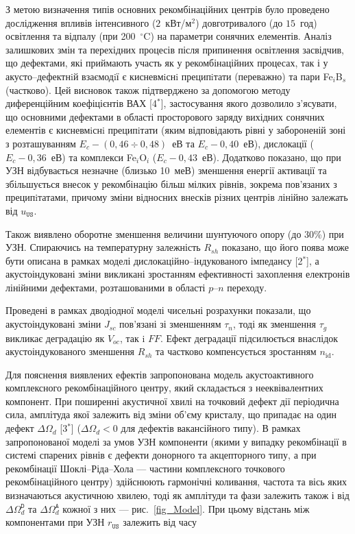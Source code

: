 З метою визначення типів основних рекомбінаційних центрів
було проведено дослідження впливів інтенсивного ($2$~кВт/м$^2$) довготривалого (до  $15$~год) освітлення
та відпалу (при 200~$^\circ$C) на параметри сонячних елементів.
Аналіз залишкових змін та перехідних процесів після припинення освітлення засвідчив, що дефектами, які приймають участь як у рекомбінаційних процесах, так і у акусто--дефектнiй взаємодiї є кисневмiснi преципiтати (переважно) та
пари Fe$_i$B$_s$ (частково).
Цей висновок також підтверджено за допомогою методу диференційним коефіцієнтів ВАХ
[4$^*$],
застосування якого дозволило з'ясувати, що основними дефектами в області просторового заряду вихідних сонячних елементів є кисневмiснi преципiтати  (яким відповідають рівні у забороненій зоні з розташуванням  $E_c-(0,46\div0,48)$~еВ та $E_c-0,40$~еВ), дислокації ($E_c-0,36$~еВ) та комплекси Fe$_i$O$_i$ ($E_c-0,43$~еВ).
Додатково показано, що
при УЗН відбувається незначне (близько 10~меВ) зменшення енергії активації та збільшується внесок
у рекомбінацію більш мілких рівнів, зокрема пов'язаних з преципiтатами, причому зміни відносних внесків різних центрів лінійно залежать від $u_\mathtt{US}$.

Також виявлено оборотне зменшення величини шунтуючого опору (до 30\%) при УЗН.
Спираючись на температурну залежність $R_{sh}$ показано, що його поява може бути описана в рамках моделі дислокаційно--індукованого імпедансу
[2$^*$], а акустоіндуковані зміни викликані зростанням ефективності захоплення електронів лінійними дефектами, розташованими в області $p$--$n$ переходу.

Проведені в рамках дводіодної моделі чисельні розрахунки показали, що акустоіндуковані зміни $J_{sc}$ пов'язані зі зменшенням $\tau_{n}$,
тоді як зменшення $\tau_{g}$ викликає деградацію як $V_{oc}$, так i $F\!F$.
Ефект деградації підсилюється внаслідок акустоіндукованого зменшення $R_{sh}$ та частково компенсується зростанням $n_\mathrm{id}$.

Для пояснення виявлених ефектів запропонована модель акустоактивного комплексного рекомбінаційного центру, який складається з нееквівалентних компонент.
При поширенні акустичної хвилі на точковий дефект дії періодична сила, амплітуда якої залежить від зміни об'єму кристалу, що припадає на один дефект $\Delta\Omega_d$
[3$^*$] ($\Delta\Omega_d<0$ для дефектів вакансійного типу).
В рамках запропонованої моделі за умов УЗН компоненти (якими у випадку рекомбінації в системі спарених рівнів є  дефекти донорного та акцепторного типу, а при рекомбінації Шоклі--Ріда--Хола --- частини комплексного точкового рекомбінаційного центру) здійснюють гармонічні коливання, частота та вісь яких
визначаються акустичною хвилею, тоді як амплітуди та фази залежить також і від  $\Delta\Omega_d^\mathtt{D}$ та
$\Delta\Omega_d^\mathtt{A}$ кожної з них --- рис.~\ref{fig_Model}.
При цьому відстань між компонентами при УЗН $r_\mathtt{US}$ залежить від часу

